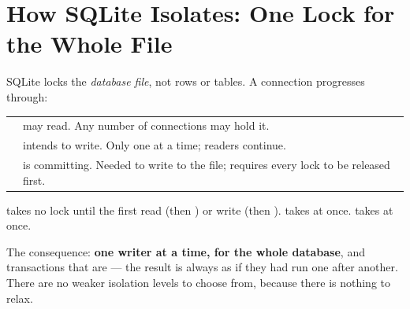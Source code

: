 \section{How SQLite Isolates: One Lock for the Whole File}

\begin{definitionbox}
SQLite locks the \emph{database file}, not rows or tables. A connection
progresses through:

\smallskip
\begin{tabular}{@{}L{2.8cm}L{11.0cm}@{}}
 & may read. Any number of connections may hold it. \\
 & intends to write. Only one at a time; readers continue. \\
 & is committing. Needed to write to the file; requires
  every  lock to be released first. \\
\end{tabular}

\smallskip
{} takes no lock until the first read (then
) or write (then ). 
takes  at once.  takes
 at once.

\smallskip
The consequence: \textbf{one writer at a time, for the whole database}, and
transactions that are  --- the result is always as if they
had run one after another. There are no weaker isolation levels to choose
from, because there is nothing to relax.
\end{definitionbox}

